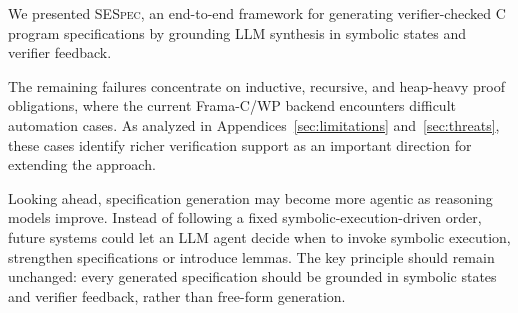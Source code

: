 \documentclass[lettersize,journal]{IEEEtran}
\newcommand{\toolname}{\textsc{SESpec}}
\newcommand{\apptworef}[2]{Appendices~\ref{#1} and~\ref{#2}}
\begin{document}



We presented \toolname, an end-to-end framework for generating verifier-checked C program specifications by grounding LLM synthesis in symbolic states and verifier feedback.

{The remaining failures concentrate on inductive, recursive, and heap-heavy proof obligations, where the current Frama-C/WP backend encounters difficult automation cases. As analyzed in \apptworef{sec:limitations}{sec:threats}, these cases identify richer verification support as an important direction for extending the approach.}

Looking ahead, specification generation may become more agentic as reasoning models improve. Instead of following a fixed symbolic-execution-driven order, future systems could let an LLM agent decide when to invoke symbolic execution, strengthen specifications or introduce lemmas. The key principle should remain unchanged: every generated specification should be grounded in symbolic states and verifier feedback, rather than free-form generation.
\end{document}
